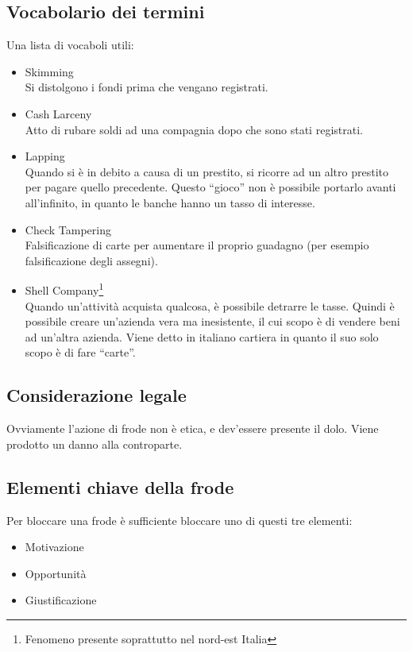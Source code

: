 
\subsection{Vocabolario dei termini}

Una lista di vocaboli utili:
\begin{itemize}
  \item Skimming \\
  Si distolgono i fondi prima che vengano registrati.
  \item Cash Larceny \\
  Atto di rubare soldi ad una compagnia dopo che sono stati registrati.
  \item Lapping \\
  Quando si è in debito a causa di un prestito, si ricorre ad un
  altro prestito per pagare quello precedente. Questo ``gioco'' non è possibile
  portarlo avanti all'infinito, in quanto le banche hanno un tasso di interesse.
  \item Check Tampering \\
  Falsificazione di carte per aumentare il proprio guadagno (per esempio
falsificazione degli assegni).
  \item Shell Company\footnote{Fenomeno presente soprattutto nel nord-est 
  Italia} \\
  Quando un'attività acquista qualcosa, è possibile detrarre le tasse. Quindi è
  possibile creare un'azienda vera ma inesistente, il cui scopo è di vendere
  beni ad un'altra azienda. Viene detto in italiano cartiera in quanto il suo 
  solo scopo è di fare ``carte''.
\end{itemize}

\subsection{Considerazione legale}

Ovviamente l'azione di frode non è etica, e dev'essere presente il dolo. Viene
prodotto un danno alla controparte.

\subsection{Elementi chiave della frode}

Per bloccare una frode è sufficiente bloccare uno di questi tre elementi:
\begin{itemize}
  \item Motivazione
  \item Opportunità
  \item Giustificazione
\end{itemize}

